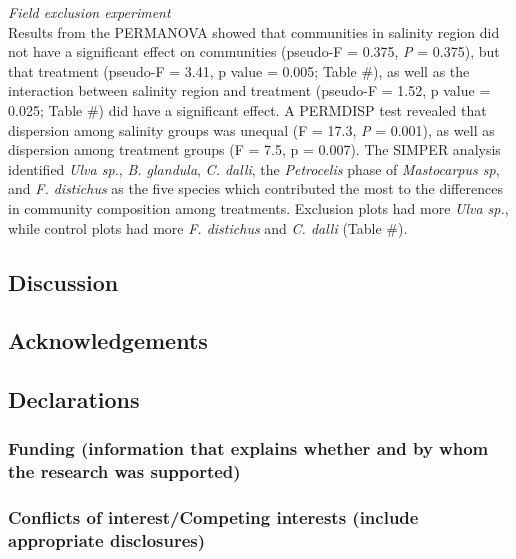 \documentclass[
  11pt,
]{article}
\begin{document}
\emph{Field exclusion experiment}\\
Results from the PERMANOVA showed that communities in salinity region did not have a significant effect on communities (pseudo-F = 0.375, \emph{P} = 0.375), but that treatment (pseudo-F = 3.41, p value = 0.005; Table \#), as well as the interaction between salinity region and treatment (pseudo-F = 1.52, p value = 0.025; Table \#) did have a significant effect. A PERMDISP test revealed that dispersion among salinity groups was unequal (F = 17.3, \emph{P} = 0.001), as well as dispersion among treatment groups (F = 7.5, p = 0.007). The SIMPER analysis identified \emph{Ulva sp.}, \emph{B. glandula}, \emph{C. dalli}, the \emph{Petrocelis} phase of \emph{Mastocarpus sp}, and \emph{F. distichus} as the five species which contributed the most to the differences in community composition among treatments. Exclusion plots had more \emph{Ulva sp.}, while control plots had more \emph{F. distichus} and \emph{C. dalli} (Table \#).

\hypertarget{discussion}{%
\subsection{Discussion}\label{discussion}}

\hypertarget{acknowledgements}{%
\subsection{Acknowledgements}\label{acknowledgements}}

\hypertarget{declarations}{%
\subsection{Declarations}\label{declarations}}

\hypertarget{funding-information-that-explains-whether-and-by-whom-the-research-was-supported}{%
\subsubsection{Funding (information that explains whether and by whom the research was supported)}\label{funding-information-that-explains-whether-and-by-whom-the-research-was-supported}}

\hypertarget{conflicts-of-interestcompeting-interests-include-appropriate-disclosures}{%
\subsubsection{Conflicts of interest/Competing interests (include appropriate disclosures)}\label{conflicts-of-interestcompeting-interests-include-appropriate-disclosures}}
\end{document}
